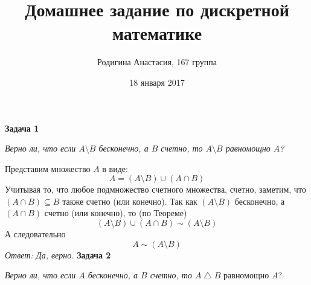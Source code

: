 \documentclass{article}
\title{Домашнее задание по дискретной математике}
\author{Родигина Анастасия, 167 группа}
\date{18 января 2017}
\begin{document}
            

\maketitle  
 \noindent \textbf{Задача 1}
\begin{center} 
\textit{Верно ли, что если $A\setminus B$ бесконечно, а $B$ счетно,
     то $A\setminus B$ равномощно $A$?}
\end{center}
\indent Представим множество $A$ в виде:
$$A = (A \setminus B) \cup (A \cap B)$$
Учитывая то, что любое подмножество счетного множества, счетно, заметим, что $(A \cap B) \subseteq B$ также счетно (или конечно).
Так как $(A \setminus B)$ бесконечно, а $(A \cap B)$ счетно (или конечно), то (по Теореме)
$$(A \setminus B) \cup (A \cap B) \sim (A \setminus B) $$
А следовательно $$A \sim (A \setminus B)$$
\textit{Ответ: Да, верно.}
\newline
\newline
\textbf{Задача 2}
\begin{center}
\textit{ Верно ли, что если $A$ бесконечно, а $B$ счетно, то $A \bigtriangleup B$} равномощно $A$?
\end{center}
\end{document}
